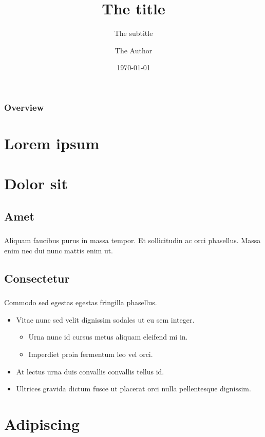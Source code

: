 \documentclass[10pt]{beamer}
\title{The title}
\subtitle{The subtitle}
\author{The Author}
\institute[]{Red Hat}
\date{\today}
\newcommand{\autotitle}{
    \frametitle{
        \secname
        \ifx \insertsubsection \empty \else { / \subsecname} \fi
    }
}
\begin{document}
\begin{frame}
    \titlepage
\end{frame}

\begin{frame}
    \frametitle{Overview}
    \tableofcontents
\end{frame}

\section{Lorem ipsum}

\section{Dolor sit}
\subsection{Amet}

\begin{frame}
    \autotitle
    Aliquam faucibus purus in massa tempor.  Et sollicitudin ac orci phasellus.
    Massa enim nec dui nunc mattis enim ut.
\end{frame}

\subsection{Consectetur}

\begin{frame}
    \autotitle
    Commodo sed egestas egestas fringilla phasellus.
    \begin{itemize}
        \item
            Vitae nunc sed velit dignissim sodales ut eu sem integer.
            \begin{itemize}
                \item Urna nunc id cursus metus aliquam eleifend mi in.
                \item Imperdiet proin fermentum leo vel orci.
            \end{itemize}
        \item
            At lectus urna duis convallis convallis tellus id.
        \item
            Ultrices gravida dictum fusce ut placerat orci nulla pellentesque
            dignissim.
    \end{itemize}
\end{frame}

\section{Adipiscing}
\end{document}
